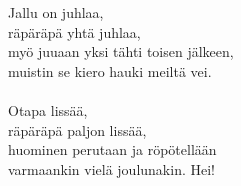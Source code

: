 
Jallu on juhlaa, \\ räpäräpä yhtä juhlaa, \\ myö juuaan yksi tähti toisen jälkeen, \\ muistin se kiero hauki meiltä vei. \\ \hspace{10mm} \\ Otapa lissää, \\ räpäräpä paljon lissää, \\ huominen perutaan ja röpötellään \\ varmaankin vielä joulunakin. Hei!